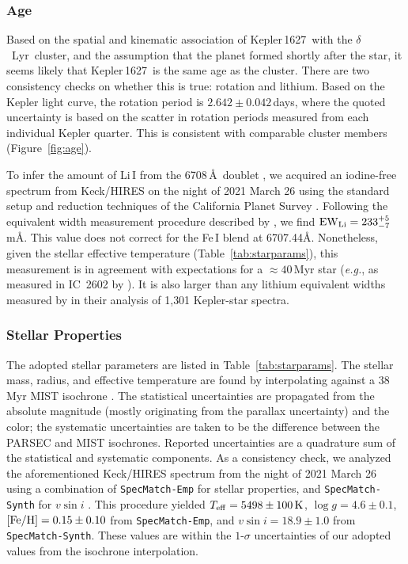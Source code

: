 \documentclass[12pt,modern,twocolumn,tighten,linenumbers]{aastex63}
\newcommand{\cn}{$\delta$\ Lyr\ cluster} %
\newcommand{\sn}{Kepler\,1627} %
\begin{document}
\subsubsection{Age}
Based on the spatial and kinematic association of \sn\ with the \cn,
and the assumption that the planet formed shortly after the star, it
seems likely that \sn\ is the same age as the cluster. There are two
consistency checks on whether this is true: rotation and lithium.
Based on the Kepler light curve, the rotation period is
$2.642\pm0.042$\,days, where the quoted uncertainty is based on the
scatter in rotation periods measured from each individual Kepler
quarter.  This is consistent with comparable cluster members
(Figure~\ref{fig:age}).

To infer the amount of Li\,\textsc{I} from the 6708\,\AA\ doublet
\citep[{\it e.g.},][]{soderblom_ages_2014}, we acquired an iodine-free
spectrum from Keck/HIRES on the night of 2021 March 26 using the
standard setup and reduction techniques of the California Planet
Survey \citep{howard_cps_2010}.  Following the equivalent width
measurement procedure described by \citet{bouma_2021_ngc2516}, we find
${\rm EW}_{\rm Li} = 233^{+5}_{-7}$\,m\AA.   This value does not
correct for the Fe\,\textsc{I} blend at 6707.44\AA.  Nonetheless,
given the stellar effective temperature (Table~\ref{tab:starparams}),
this measurement is in agreement with expectations for a
$\approx40$\,Myr star ({\it e.g.}, as measured in IC~2602 by
\citealt{randich_gaiaeso_2018}).  It is also larger than any lithium
equivalent widths measured by \citet{berger_identifying_2018} in their
analysis of 1{,}301 Kepler-star spectra.


\subsubsection{Stellar Properties}

The adopted stellar parameters are listed in
Table~\ref{tab:starparams}.  The stellar mass, radius, and effective
temperature are found by interpolating against a 38$\,$Myr MIST
isochrone \citep{choi_mesa_2016}.  The statistical uncertainties are
propagated from the absolute magnitude (mostly originating from the
parallax uncertainty) and the color; the systematic uncertainties are
taken to be the difference between the PARSEC
\citep{bressan_parsec_2012} and MIST isochrones.  Reported
uncertainties are a quadrature sum of the statistical and systematic
components.  As a consistency check, we analyzed the aforementioned
Keck/HIRES spectrum from the night of 2021 March 26 using a
combination of \texttt{SpecMatch-Emp} for stellar properties, and
\texttt{SpecMatch-Synth} for $v\sin i$ \citep{yee_SM_2017}.  This
procedure yielded $T_{\rm eff}=5498\pm100\,{\rm K}$, $\log
g=4.6\pm0.1$, $[{\rm Fe/H}]=0.15\pm0.10$ from \texttt{SpecMatch-Emp},
and $v\sin i = 18.9\pm1.0$ from \texttt{SpecMatch-Synth}.  These
values are within the $1$-$\sigma$ uncertainties of our adopted values
from the isochrone interpolation.
\end{document}
